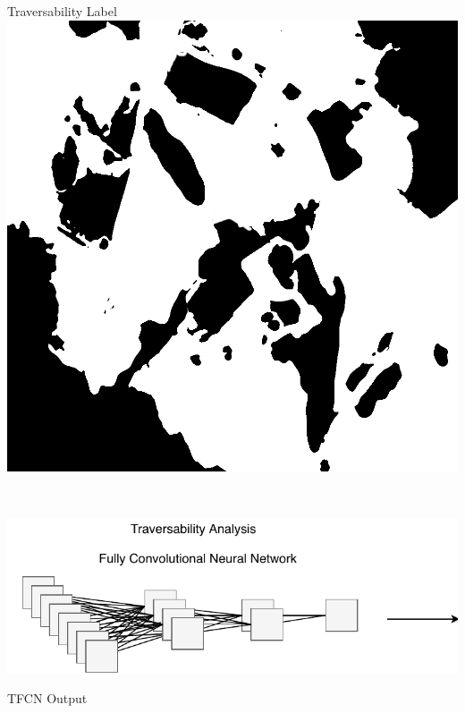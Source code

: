 \documentclass[usenames,dvipsnames,10pt]{beamer}
\begin{document}
\begin{frame}
\begin{minipage}[]{0.3\textwidth}
\end{minipage}
\hspace{0.25cm}
\begin{minipage}[]{0.3\textwidth}
	\centering
	Traversability Label
	\includegraphics[width=\textwidth]{graphics/aerial03-trav.jpg}
\end{minipage} \\
\vspace{0.25cm}
\begin{minipage}[]{0.666\textwidth}
	\includegraphics[width=\textwidth]{graphics/tfcn2.pdf}
\end{minipage}
\begin{minipage}[]{0.3\textwidth}
	\centering
	TFCN Output

\end{minipage}
\end{frame}
\end{document}

